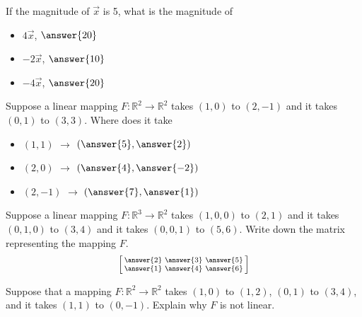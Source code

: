 \documentclass{ximera}
\begin{document}
\begin{exercise}%
    If the magnitude of $\vec{x}$ is 5, what is the magnitude of
    \begin{itemize}
        \item $4\vec{x}$, $\answer{20}$
        \item $-2\vec{x}$, $\answer{10}$
        \item $-4\vec{x}$, $\answer{20}$
    \end{itemize}
\end{exercise}

\begin{exercise}
    Suppose a linear mapping $F \colon {\mathbb R}^2 \to {\mathbb R}^2$ takes $(1,0)$ to $(2,-1)$ and it takes $(0,1)$ to $(3,3)$.  Where does it take
    \begin{itemize}
        \item $(1,1)$ $\rightarrow$ $\left(\answer{5},\answer{2}\right)$
        \item $(2,0)$ $\rightarrow$ $\left(\answer{4},\answer{-2}\right)$
        \item $(2,-1)$ $\rightarrow$ $\left(\answer{7},\answer{1}\right)$
    \end{itemize}
\end{exercise}

\begin{exercise}
    Suppose a linear mapping $F \colon {\mathbb R}^3 \to {\mathbb R}^2$ takes $(1,0,0)$ to $(2,1)$ and it takes $(0,1,0)$ to $(3,4)$ and it takes $(0,0,1)$ to $(5,6)$.  Write down the matrix representing the mapping $F$.
    \[
        \left[\begin{smallmatrix} \answer{2} & \answer{3} & \answer{5} \\ \answer{1} & \answer{4} & \answer{6} \end{smallmatrix}\right]
    \]
\end{exercise}

\begin{exercise}
    Suppose that a mapping $F \colon {\mathbb R}^2 \to \mathbb{R}^2$ takes $(1,0)$ to $(1,2)$, $(0,1)$ to $(3,4)$, and it takes $(1,1)$ to $(0,-1)$. Explain why $F$ is not linear.
\end{exercise}
\end{document}
